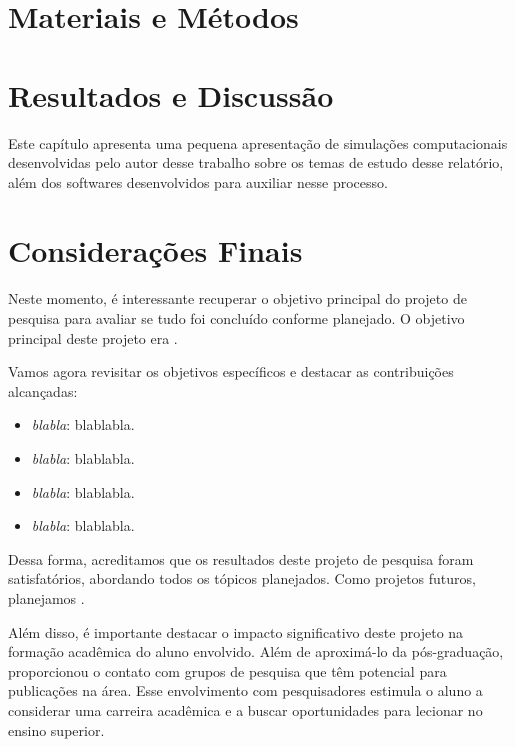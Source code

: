 \documentclass[a4paper,12pt]{report}
\theoremstyle{plain}
\theoremstyle{definition}
\begin{document}
	\newpage
	
	\chapter{Materiais e Métodos\label{sec:materiais}}
		
	
	
	\newpage

	

	\newpage
	\chapter{Resultados e Discussão\label{sec:resultados}}
	
	Este capítulo apresenta uma pequena apresentação de simulações computacionais desenvolvidas pelo autor desse trabalho sobre os temas de estudo desse relatório, além dos softwares desenvolvidos para auxiliar nesse processo.
	
	

	\chapter{Considerações Finais\label{sec:conclusoes}}
	{
		Neste momento, é interessante recuperar o objetivo principal do projeto de pesquisa para avaliar se tudo foi concluído conforme planejado. O objetivo principal deste projeto era .
		
		Vamos agora revisitar os objetivos específicos e destacar as contribuições alcançadas:
		
		\begin{itemize}
			\item \textit{blabla}: blablabla.
			\item \textit{blabla}: blablabla.
			\item \textit{blabla}: blablabla.
			\item \textit{blabla}: blablabla.
		\end{itemize}
		
		Dessa forma, acreditamos que os resultados deste projeto de pesquisa foram satisfatórios, abordando todos os tópicos planejados. Como projetos futuros, planejamos .
		
		Além disso, é importante destacar o impacto significativo deste projeto na formação acadêmica do aluno envolvido. Além de aproximá-lo da pós-graduação, proporcionou o contato com grupos de pesquisa que têm potencial para publicações na área. Esse envolvimento com pesquisadores estimula o aluno a considerar uma carreira acadêmica e a buscar oportunidades para lecionar no ensino superior.
	}

	
	
	
	
	\newpage
	\appendix	
	
\end{document}

